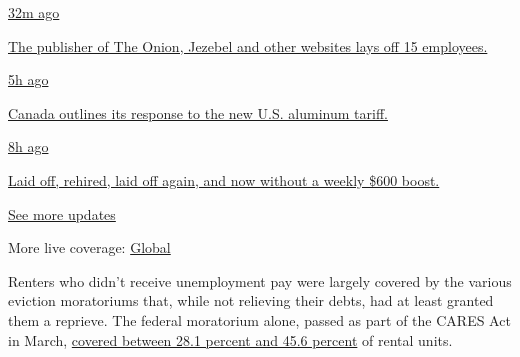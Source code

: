 \href{https://www.nytimes3xbfgragh.onion/live/2020/08/07/business/stock-market-today-coronavirus?action=click\&pgtype=Article\&state=default\&region=MAIN_CONTENT_1\&context=storylines_live_updates\#the-publisher-of-the-onion-jezebel-and-other-websites-lays-off-15-employees}{32m
ago}

\href{https://www.nytimes3xbfgragh.onion/live/2020/08/07/business/stock-market-today-coronavirus?action=click\&pgtype=Article\&state=default\&region=MAIN_CONTENT_1\&context=storylines_live_updates\#the-publisher-of-the-onion-jezebel-and-other-websites-lays-off-15-employees}{The
publisher of The Onion, Jezebel and other websites lays off 15
employees.}

\href{https://www.nytimes3xbfgragh.onion/live/2020/08/07/business/stock-market-today-coronavirus?action=click\&pgtype=Article\&state=default\&region=MAIN_CONTENT_1\&context=storylines_live_updates\#canada-outlines-its-response-to-the-new-us-aluminum-tariff}{5h
ago}

\href{https://www.nytimes3xbfgragh.onion/live/2020/08/07/business/stock-market-today-coronavirus?action=click\&pgtype=Article\&state=default\&region=MAIN_CONTENT_1\&context=storylines_live_updates\#canada-outlines-its-response-to-the-new-us-aluminum-tariff}{Canada
outlines its response to the new U.S. aluminum tariff.}

\href{https://www.nytimes3xbfgragh.onion/live/2020/08/07/business/stock-market-today-coronavirus?action=click\&pgtype=Article\&state=default\&region=MAIN_CONTENT_1\&context=storylines_live_updates\#laid-off-rehired-laid-off-again-and-now-without-a-weekly-600-boost}{8h
ago}

\href{https://www.nytimes3xbfgragh.onion/live/2020/08/07/business/stock-market-today-coronavirus?action=click\&pgtype=Article\&state=default\&region=MAIN_CONTENT_1\&context=storylines_live_updates\#laid-off-rehired-laid-off-again-and-now-without-a-weekly-600-boost}{Laid
off, rehired, laid off again, and now without a weekly \$600 boost.}

\href{https://www.nytimes3xbfgragh.onion/live/2020/08/07/business/stock-market-today-coronavirus?action=click\&pgtype=Article\&state=default\&region=MAIN_CONTENT_1\&context=storylines_live_updates}{See
more updates}

More live coverage:
\href{https://www.nytimes3xbfgragh.onion/2020/08/07/world/covid-19-news.html?action=click\&pgtype=Article\&state=default\&region=MAIN_CONTENT_1\&context=storylines_live_updates}{Global}

Renters who didn't receive unemployment pay were largely covered by the
various eviction moratoriums that, while not relieving their debts, had
at least granted them a reprieve. The federal moratorium alone, passed
as part of the CARES Act in March,
\href{https://www.frbatlanta.org/community-development/publications/partners-update/2020/covid-19-publications/200616-housing-policy-impact-federal-eviction-protection-coverage-and-the-need-for-better-data.aspx}{covered
between 28.1 percent and 45.6 percent} of rental units.

